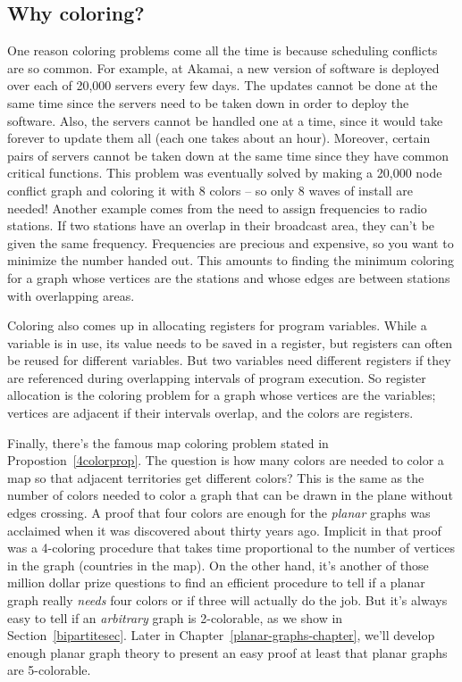\subsection{Why coloring?}

One reason coloring problems come all the time is because scheduling
conflicts are so common.  For example, at Akamai, a new version of
software is deployed over each of 20,000 servers every few days.  The
updates cannot be done at the same time since the servers need to be taken
down in order to deploy the software.  Also, the servers cannot be handled
one at a time, since it would take forever to update them all (each one
takes about an hour).  Moreover, certain pairs of servers cannot be taken
down at the same time since they have common critical functions.  This
problem was eventually solved by making a 20,000 node conflict graph and
coloring it with 8 colors -- so only 8 waves of install are needed!
Another example comes from the need to assign frequencies to radio
stations.  If two stations have an overlap in their broadcast area, they
can't be given the same frequency.  Frequencies are precious and
expensive, so you want to minimize the number handed out.  This amounts to
finding the minimum coloring for a graph whose vertices are the stations
and whose edges are between stations with overlapping areas.

Coloring also comes up in allocating registers for program variables.
While a variable is in use, its value needs to be saved in a register, but
registers can often be reused for different variables.  But two variables
need different registers if they are referenced during overlapping
intervals of program execution.  So register allocation is the coloring
problem for a graph whose vertices are the variables; vertices are
adjacent if their intervals overlap, and the colors are registers.

Finally, there's the famous map coloring problem stated in
Propostion~\ref{4colorprop}.  The question is how many colors are needed
to color a map so that adjacent territories get different colors?  This is
the same as the number of colors needed to color a graph that can be drawn
in the plane without edges crossing.  A proof that four colors are enough
for the \emph{planar} graphs was acclaimed when it was discovered about
thirty years ago.  Implicit in that proof was a 4-coloring procedure that
takes time proportional to the number of vertices in the graph (countries
in the map).  On the other hand, it's another of those million dollar
prize questions to find an efficient procedure to tell if a planar graph
really \emph{needs} four colors or if three will actually do the job.  But
it's always easy to tell if an \emph{arbitrary} graph is 2-colorable, as
we show in Section~\ref{bipartitesec}.  Later in
Chapter~\ref{planar-graphs-chapter}, we'll develop enough planar graph
theory to present an easy proof at least that planar graphs are
5-colorable.

